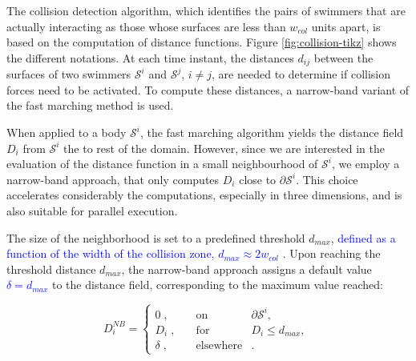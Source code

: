 \documentclass[graybox]{svmult}
\newcommand{\review}[1]{\textcolor{blue}{#1}}
\newcommand{\Solid}{\mathcal{S}} %
\begin{document}
The collision detection algorithm, which identifies the pairs of swimmers that are actually interacting as those whose surfaces are less than $w_{col}$ units apart, is based on the computation of distance functions. Figure \ref{fig:collision-tikz} shows the different notations. 
At each time instant, the distances $d_{ij}$ between the surfaces of two swimmers $\Solid^i$ and $\Solid^j$, $i \ne j$, are needed to determine if collision forces need to be activated. To compute these distances, a narrow-band variant of the fast marching method is used. 

When applied to a body $\Solid^i$, the  fast marching algorithm \cite{sethian} yields the distance field $D_i$ from $\Solid^i$ the to rest of the domain. However, since we are interested in the evaluation of the distance function in a small neighbourhood of $\Solid^i$, we employ a narrow-band approach, that only computes $D_i$ close to $\partial \Solid^i$. This choice accelerates considerably the computations, especially in three dimensions, and is also suitable for parallel execution.

The size of the neighborhood is set to a predefined threshold $d_{max}$, \review{defined as a function of the width of the collision zone, $d_{max} \approx 2 w_{col}$ }. Upon reaching the threshold distance $d_{max}$, the narrow-band 
approach assigns a default value \review{$\delta = d_{max}$} to the distance field, corresponding to the maximum value reached:
\begin{center}
	\begin{equation*}
		D_i^{NB} = \left\{\begin{array}{rcl}
		0 \;, \quad &\mbox{on }& \partial \Solid^i , \\
		D_i \;, \quad &\mbox{for }& D_i \leq d_{max} ,\\
		\delta\;, \quad &\mbox{elsewhere}&   .
		\end{array}\right.\;
	\end{equation*}
\end{center}
\end{document}
